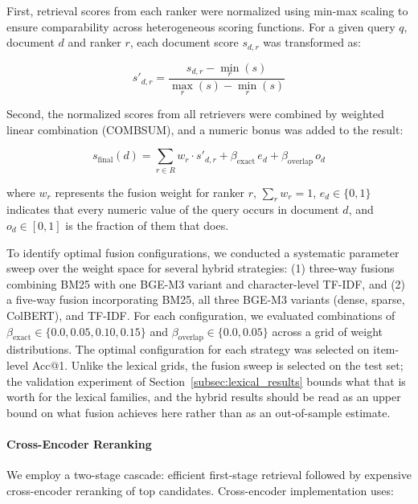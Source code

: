 \documentclass[preprint,review,12pt]{elsarticle}
\begin{document}
First, retrieval scores from each ranker were normalized using min-max scaling to ensure comparability across heterogeneous scoring functions. For a given query $q$, document $d$ and ranker $r$, each document score $s_{d,r}$ was transformed as:

\begin{equation}
s'_{d,r} = \frac{s_{d,r} - \min_r(s)}{\max_r(s) - \min_r(s)}
\end{equation}

Second, the normalized scores from all retrievers were combined by weighted linear combination (COMBSUM), and a numeric bonus was added to the result:

\begin{equation}
s_{\text{final}}(d) = \sum_{r \in R} w_r \cdot s'_{d,r} + \beta_{\text{exact}}\, e_d + \beta_{\text{overlap}}\, o_d
\end{equation}

where $w_r$ represents the fusion weight for ranker $r$, $\sum_{r} w_r = 1$, $e_d \in \{0,1\}$ indicates that every numeric value of the query occurs in document $d$, and $o_d \in [0,1]$ is the fraction of them that does.

To identify optimal fusion configurations, we conducted a systematic parameter sweep over the weight space for several hybrid strategies: (1) three-way fusions combining BM25 with one BGE-M3 variant and character-level TF-IDF, and (2) a five-way fusion incorporating BM25, all three BGE-M3 variants (dense, sparse, ColBERT), and TF-IDF. For each configuration, we evaluated combinations of $\beta_{\text{exact}} \in \{0.0, 0.05, 0.10, 0.15\}$ and $\beta_{\text{overlap}} \in \{0.0, 0.05\}$ across a grid of weight distributions. The optimal configuration for each strategy was selected on item-level Acc@1. Unlike the lexical grids, the fusion sweep is selected on the test set; the validation experiment of Section~\ref{subsec:lexical_results} bounds what that is worth for the lexical families, and the hybrid results should be read as an upper bound on what fusion achieves here rather than as an out-of-sample estimate.

\paragraph{Cross-Encoder Reranking}
We employ a two-stage cascade: efficient first-stage retrieval followed by expensive cross-encoder reranking of top candidates. Cross-encoder implementation uses:
\end{document}

